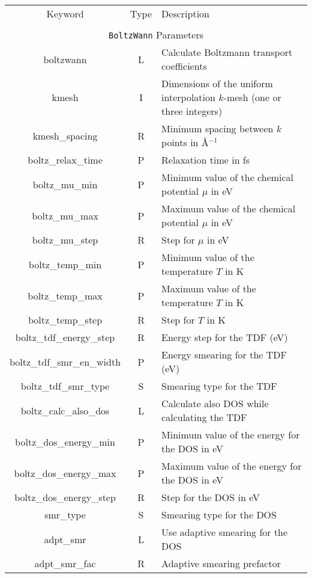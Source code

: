 \begin{table}[hH!]
\begin{center}
\begin{tabular}{|c|c|p{6cm}|}
\hline
Keyword & Type & Description \\
        &      &             \\
\hline\hline
\multicolumn{3}{|c|}{{\tt BoltzWann} Parameters} \\
\hline
{\sc boltzwann}   & L & Calculate Boltzmann transport coefficients \\
{\sc [boltz\_]kmesh} & I & Dimensions of the uniform interpolation 
$k$-mesh (one or three integers)\\ 
{\sc [boltz\_]kmesh\_spacing} & R & Minimum spacing between $k$ points in \AA$^{-1}$\\
{\sc boltz\_relax\_time} & P & Relaxation time in fs\\
{\sc boltz\_mu\_min} & P & Minimum value of the chemical potential $\mu$ in eV\\
{\sc boltz\_mu\_max} & P & Maximum value of the chemical potential $\mu$ in eV\\
{\sc boltz\_mu\_step} & R & Step for $\mu$ in eV\\
{\sc boltz\_temp\_min} & P & Minimum value of the temperature $T$ in K \\
{\sc boltz\_temp\_max} & P & Maximum value of the temperature $T$ in K \\
{\sc boltz\_temp\_step} & R & Step for $T$ in K \\
{\sc boltz\_tdf\_energy\_step} & R & Energy step for the TDF (eV) \\
{\sc boltz\_tdf\_smr\_en\_width} & P & Energy smearing for the TDF (eV) \\
{\sc boltz\_tdf\_smr\_type} & S & Smearing type for the TDF \\
{\sc boltz\_calc\_also\_dos} & L & Calculate also DOS while calculating the TDF\\
{\sc boltz\_dos\_energy\_min} & P & Minimum value of the energy for the DOS in eV \\
{\sc boltz\_dos\_energy\_max} & P & Maximum value of the energy for the DOS in eV \\
{\sc boltz\_dos\_energy\_step} & R & Step for the DOS in eV\\
{smr\_type} & S & Smearing type for the DOS \\
{adpt\_smr} & L & Use adaptive smearing for the DOS \\
{adpt\_smr\_fac} & R & Adaptive smearing prefactor\\

\end{tabular}
\end{center}
\end{table}
